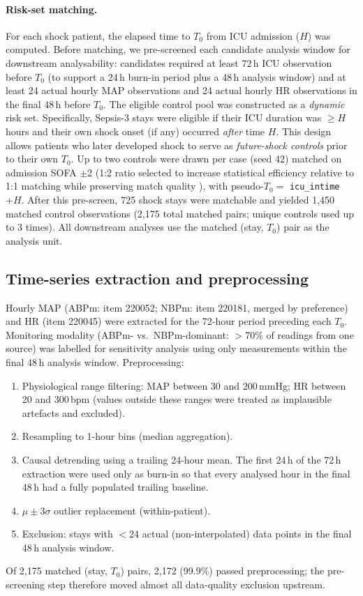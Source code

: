 \documentclass[referee,lineno,pdflatex]{sn-article-template/sn-jnl}
\begin{document}
\paragraph{Risk-set matching.}
For each shock patient, the elapsed time to $T_0$ from ICU admission ($H$) was computed.
Before matching, we pre-screened each candidate analysis window for downstream
analysability: candidates required at least 72\,h ICU observation before $T_0$
(to support a 24\,h burn-in period plus a 48\,h analysis window) and at least
24 actual hourly MAP observations and 24 actual hourly HR observations in the
final 48\,h before $T_0$.
The eligible control pool was constructed as a \emph{dynamic} risk set.
Specifically, Sepsis-3 stays were eligible if their ICU duration was $\geq H$ hours
and their own shock onset (if any) occurred \emph{after} time $H$.
This design allows patients who later developed shock to serve as
\emph{future-shock controls} prior to their own $T_0$.
Up to two controls were drawn per case (seed 42) matched on admission SOFA $\pm$2
(1:2 ratio selected to increase statistical efficiency relative to 1:1 matching
while preserving match quality \cite{austin2010}),
with pseudo-$T_0 =$ \texttt{icu\_intime} $+ H$.
After this pre-screen, 725 shock stays were matchable and yielded 1,450 matched control
observations (2,175 total matched pairs; unique controls used up to 3 times).
All downstream analyses use the matched (stay, $T_0$) pair as the analysis unit.

\subsection{Time-series extraction and preprocessing}
\label{sec:preprocessing}

Hourly MAP (ABPm: item 220052; NBPm: item 220181, merged by preference)
and HR (item 220045) were extracted for the 72-hour period preceding each $T_0$.
Monitoring modality (ABPm- vs.\ NBPm-dominant: $>$70\% of readings from one source)
was labelled for sensitivity analysis using only measurements within the final
48\,h analysis window.
Preprocessing:
\begin{enumerate}
  \item Physiological range filtering: MAP between 30 and 200\,mmHg; HR between 20 and 300\,bpm (values outside these ranges were treated as implausible artefacts and excluded).
  \item Resampling to 1-hour bins (median aggregation).
  \item Causal detrending using a trailing 24-hour mean.
    The first 24\,h of the 72\,h extraction were used only as burn-in so that every
    analysed hour in the final 48\,h had a fully populated trailing baseline.
  \item $\mu \pm 3\sigma$ outlier replacement (within-patient).
  \item Exclusion: stays with $<$24 actual (non-interpolated) data points in the
    final 48\,h analysis window.
\end{enumerate}
Of 2,175 matched (stay, $T_0$) pairs, 2,172 (99.9\%) passed preprocessing;
the pre-screening step therefore moved almost all data-quality exclusion upstream.
\end{document}
